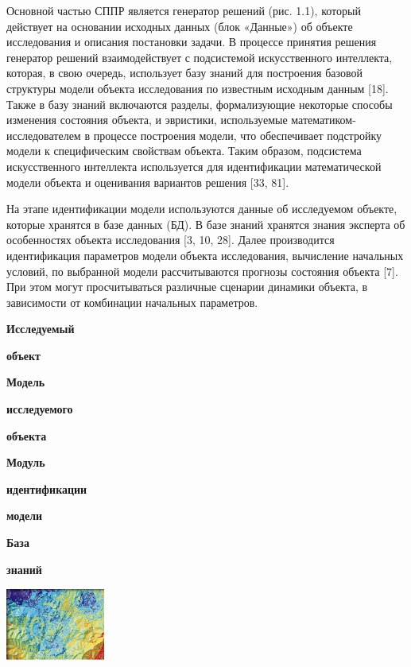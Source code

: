 \documentclass{article}
\begin{document}
Основной частью СППР является генератор решений 
(рис. 1.1), который действует на основании исходных 
данных (блок «Данные») об объекте исследования 
и описания постановки задачи. В процессе принятия 
решения генератор решений взаимодействует 
с подсистемой искусственного интеллекта, которая, 
в свою очередь, использует базу знаний для построения 
базовой структуры модели объекта исследования 
по известным исходным данным [18]. Также в базу 
знаний включаются разделы, формализующие некоторые 
способы изменения состояния объекта, и эвристики, 
используемые математиком-исследователем в 
процессе построения модели, что обеспечивает 
подстройку модели к специфическим свойствам 
объекта. Таким образом, подсистема искусственного 
интеллекта используется для идентификации 
математической модели объекта и оценивания 
вариантов решения [33, 81].

На этапе идентификации модели используются 
данные об исследуемом объекте, которые хранятся 
в базе данных (БД). В базе знаний хранятся знания 
эксперта об особенностях объекта исследования 
[3, 10, 28]. Далее  производится идентификация параметров 
модели объекта исследования, вычисление начальных 
условий, по выбранной модели рассчитываются 
прогнозы состояния объекта [7]. При этом могут 
просчитываться различные сценарии динамики 
объекта, в зависимости от комбинации начальных 
параметров. 

\begin{center}
\textbf{Исследуемый}

\textbf{объект}

\textbf{Модель}

\textbf{исследуемого}

\textbf{объекта}

\textbf{Модуль}

\textbf{идентификации}

\textbf{модели}

\textbf{База}

\textbf{знаний}
\end{center}

\includegraphics[width=94pt, height=68pt, keepaspectratio=true]{asyaDisser9_3-fig001.jpg}
\end{document}
